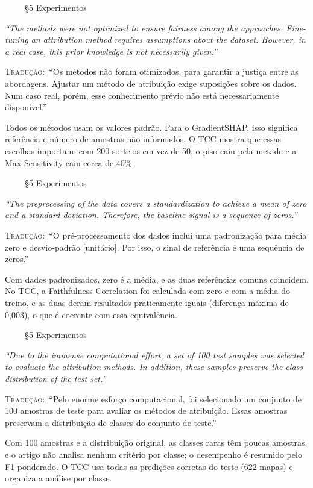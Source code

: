 \documentclass[11pt,a4paper]{article}
\newcommand{\pagechip}[1]{{\setlength{\fboxsep}{1.5pt}\colorbox{cAcc}{\textcolor{white}{\scriptsize\texttt{#1}}}}}
\newenvironment{origquote}{\par\itshape\small}{\par}
\newenvironment{tradquote}{\par\small\textsc{Tradução:}\ }{\par}
\newcommand{\explab}[1]{\par\smallskip{\small\color{cAcc}\textbf{\MakeUppercase{#1}}}\par}
\begin{document}
\begin{citacard}{\pagechip{p. 3} §5 Experimentos}
\begin{origquote}“The methods were not optimized to ensure fairness among the approaches. Fine-tuning an attribution method requires assumptions about the dataset. However, in a real case, this prior knowledge is not necessarily given.”\end{origquote}
\begin{tradquote}“Os métodos não foram otimizados, para garantir a justiça entre as abordagens. Ajustar um método de atribuição exige suposições sobre os dados. Num caso real, porém, esse conhecimento prévio não está necessariamente disponível.”\end{tradquote}
\explab{Explicação}
Todos os métodos usam os valores padrão. Para o GradientSHAP, isso significa referência e número de amostras não informados. O TCC mostra que essas escolhas importam: com 200 sorteios em vez de 50, o piso caiu pela metade e a Max-Sensitivity caiu cerca de 40\%.
\end{citacard}

\begin{citacard}{\pagechip{p. 3} §5 Experimentos}
\begin{origquote}“The preprocessing of the data covers a standardization to achieve a mean of zero and a standard deviation. Therefore, the baseline signal is a sequence of zeros.”\end{origquote}
\begin{tradquote}“O pré-processamento dos dados inclui uma padronização para média zero e desvio-padrão [unitário]. Por isso, o sinal de referência é uma sequência de zeros.”\end{tradquote}
\explab{Explicação}
Com dados padronizados, zero é a média, e as duas referências comuns coincidem. No TCC, a Faithfulness Correlation foi calculada com zero e com a média do treino, e as duas deram resultados praticamente iguais (diferença máxima de 0,003), o que é coerente com essa equivalência.
\end{citacard}

\begin{citacard}{\pagechip{p. 4} §5 Experimentos}
\begin{origquote}“Due to the immense computational effort, a set of 100 test samples was selected to evaluate the attribution methods. In addition, these samples preserve the class distribution of the test set.”\end{origquote}
\begin{tradquote}“Pelo enorme esforço computacional, foi selecionado um conjunto de 100 amostras de teste para avaliar os métodos de atribuição. Essas amostras preservam a distribuição de classes do conjunto de teste.”\end{tradquote}
\explab{Explicação}
Com 100 amostras e a distribuição original, as classes raras têm poucas amostras, e o artigo não analisa nenhum critério por classe; o desempenho é resumido pelo F1 ponderado. O TCC usa todas as predições corretas do teste (622 mapas) e organiza a análise por classe.
\end{citacard}
\end{document}
